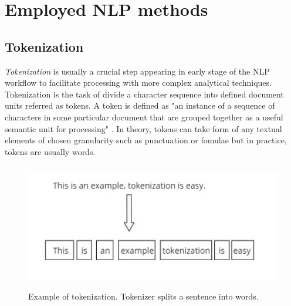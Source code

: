 \section{Employed NLP methods}
\subsection*{Tokenization}
\textit{Tokenization} is usually a crucial step appearing in early stage of the NLP workflow to facilitate processing with more complex analytical techniques. Tokenization is the task of divide a character sequence into defined document units referred as tokens. A token is defined as "an instance of a sequence of characters in some particular document that are grouped together as a useful semantic unit for processing" \cite{Manning:2008:IIR:1394399}. In theory, tokens can take form of any textual elements of chosen granularity such as punctuation or fomulae but in practice, tokens are usually words.\\

\begin{figure}
\centering
\includegraphics[width=\textwidth, clip=true, height = 5.5cm]{img/tokenization_example}
\caption[Tokenization example]{ Example of tokenization. Tokenizer splits a sentence into words.} 
\label{fig:token_ex1}
\end{figure}

